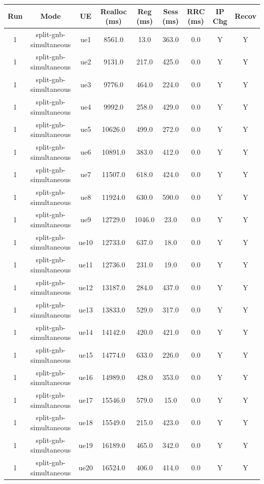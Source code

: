 \begin{table}[ht]
\centering
\begin{tabular}{|c|c|c|c|c|c|c|c|c|}
\hline
Run & Mode & UE & Realloc (ms) & Reg (ms) & Sess (ms) & RRC (ms) & IP Chg & Recov \\
\hline
1 & split-gnb-simultaneous & ue1 & 8561.0 & 13.0 & 363.0 & 0.0 & Y & Y \\
1 & split-gnb-simultaneous & ue2 & 9131.0 & 217.0 & 425.0 & 0.0 & Y & Y \\
1 & split-gnb-simultaneous & ue3 & 9776.0 & 464.0 & 224.0 & 0.0 & Y & Y \\
1 & split-gnb-simultaneous & ue4 & 9992.0 & 258.0 & 429.0 & 0.0 & Y & Y \\
1 & split-gnb-simultaneous & ue5 & 10626.0 & 499.0 & 272.0 & 0.0 & Y & Y \\
1 & split-gnb-simultaneous & ue6 & 10891.0 & 383.0 & 412.0 & 0.0 & Y & Y \\
1 & split-gnb-simultaneous & ue7 & 11507.0 & 618.0 & 424.0 & 0.0 & Y & Y \\
1 & split-gnb-simultaneous & ue8 & 11924.0 & 630.0 & 590.0 & 0.0 & Y & Y \\
1 & split-gnb-simultaneous & ue9 & 12729.0 & 1046.0 & 23.0 & 0.0 & Y & Y \\
1 & split-gnb-simultaneous & ue10 & 12733.0 & 637.0 & 18.0 & 0.0 & Y & Y \\
1 & split-gnb-simultaneous & ue11 & 12736.0 & 231.0 & 19.0 & 0.0 & Y & Y \\
1 & split-gnb-simultaneous & ue12 & 13187.0 & 284.0 & 437.0 & 0.0 & Y & Y \\
1 & split-gnb-simultaneous & ue13 & 13833.0 & 529.0 & 317.0 & 0.0 & Y & Y \\
1 & split-gnb-simultaneous & ue14 & 14142.0 & 420.0 & 421.0 & 0.0 & Y & Y \\
1 & split-gnb-simultaneous & ue15 & 14774.0 & 633.0 & 226.0 & 0.0 & Y & Y \\
1 & split-gnb-simultaneous & ue16 & 14989.0 & 428.0 & 353.0 & 0.0 & Y & Y \\
1 & split-gnb-simultaneous & ue17 & 15546.0 & 579.0 & 15.0 & 0.0 & Y & Y \\
1 & split-gnb-simultaneous & ue18 & 15549.0 & 215.0 & 423.0 & 0.0 & Y & Y \\
1 & split-gnb-simultaneous & ue19 & 16189.0 & 465.0 & 342.0 & 0.0 & Y & Y \\
1 & split-gnb-simultaneous & ue20 & 16524.0 & 406.0 & 414.0 & 0.0 & Y & Y \\

\end{tabular}
\end{table}
